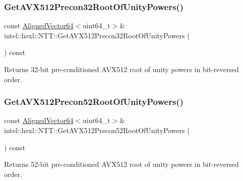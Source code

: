 \subsubsection{\texorpdfstring{Get\+A\+V\+X512\+Precon32\+Root\+Of\+Unity\+Powers()}{GetAVX512Precon32RootOfUnityPowers()}}
{\footnotesize\ttfamily const \hyperlink{namespaceintel_1_1hexl_afbdf0d2cc4209ee547a88ff22a02801b}{Aligned\+Vector64}$<$uint64\+\_\+t$>$\& intel\+::hexl\+::\+N\+T\+T\+::\+Get\+A\+V\+X512\+Precon32\+Root\+Of\+Unity\+Powers (\begin{DoxyParamCaption}{ }\end{DoxyParamCaption}) const\hspace{0.3cm}{\ttfamily [inline]}}



Returns 32-\/bit pre-\/conditioned A\+V\+X512 root of unity powers in bit-\/reversed order. 

\mbox{\label{classintel_1_1hexl_1_1NTT_aca9903ac08ed7e06d343f85a0ced8b04}} 
\subsubsection{\texorpdfstring{Get\+A\+V\+X512\+Precon52\+Root\+Of\+Unity\+Powers()}{GetAVX512Precon52RootOfUnityPowers()}}
{\footnotesize\ttfamily const \hyperlink{namespaceintel_1_1hexl_afbdf0d2cc4209ee547a88ff22a02801b}{Aligned\+Vector64}$<$uint64\+\_\+t$>$\& intel\+::hexl\+::\+N\+T\+T\+::\+Get\+A\+V\+X512\+Precon52\+Root\+Of\+Unity\+Powers (\begin{DoxyParamCaption}{ }\end{DoxyParamCaption}) const\hspace{0.3cm}{\ttfamily [inline]}}



Returns 52-\/bit pre-\/conditioned A\+V\+X512 root of unity powers in bit-\/reversed order. 

\mbox{\label{classintel_1_1hexl_1_1NTT_afb5b2c6cd1135f708c5e8a4e97d6f7da}} 
